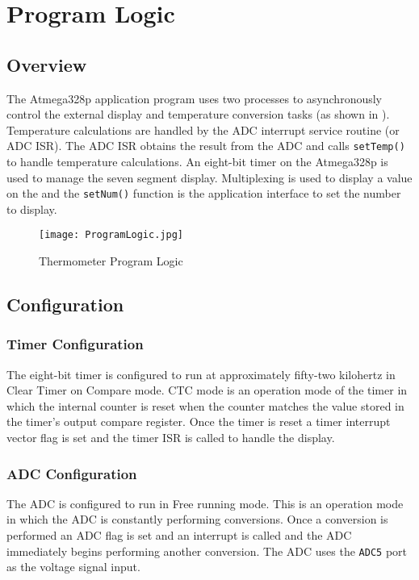 \documentclass[main.tex]{subfiles}
\begin{document}
\chapter{Program Logic} 
	\section{Overview}
	The Atmega328p application program uses two processes to asynchronously
	control the external display and temperature conversion tasks (as shown in
	).	Temperature calculations are handled by the ADC
	interrupt service routine (or ADC ISR). The ADC ISR obtains the result from
	the ADC and calls \lstinline{setTemp()} to handle temperature calculations.
	An eight-bit timer on the Atmega328p is used to manage the seven segment
	display.  Multiplexing is used to display a value on the and the
	\lstinline{setNum()} function is the application interface to set the number
	to display. 
	
	\begin{figure}[H]
		\begin{center}
			\texttt{[image: ProgramLogic.jpg]}
		\end{center}
		\caption{Thermometer Program Logic}
		\label{fig:progLogic}
	\end{figure}

	\section{Configuration}
		\subsection{Timer Configuration}
		The eight-bit timer is configured to run at approximately fifty-two kilohertz
		in Clear Timer on Compare mode. CTC mode is an operation mode of the timer in
		which the internal counter is reset when the counter matches the value stored
		in the timer's output compare register. Once the timer is reset a timer
		interrupt vector flag is set and the timer ISR is called to handle the display.

		\subsection{ADC Configuration}
		The ADC is configured to run in Free running mode. This is an operation mode
		in which the ADC is constantly performing conversions. Once a conversion is
		performed an ADC flag is set and an interrupt is called and the ADC
		immediately begins performing another conversion. The ADC uses the
		\lstinline{ADC5} port as the voltage signal input. 
\end{document}
